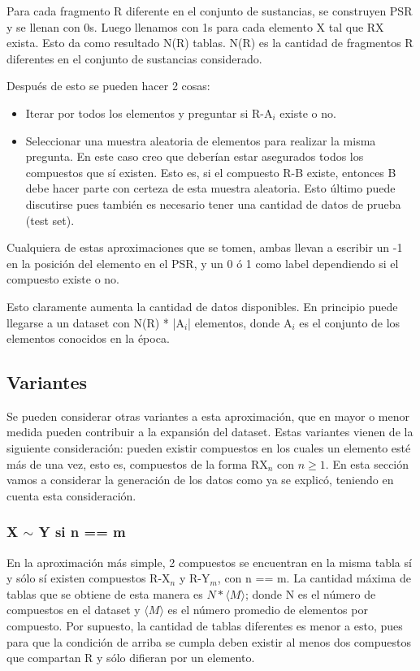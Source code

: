 \documentclass[twoside,twocolumn]{article}
\begin{document}
Para cada fragmento R diferente en el conjunto de sustancias, se construyen PSR y se llenan con 0s. 
Luego llenamos con 1s para cada elemento X tal que RX exista. Esto da como resultado N(R) tablas. N(R) es la cantidad de fragmentos R diferentes en el conjunto de sustancias considerado.

Despu\'es de esto se pueden hacer 2 cosas:

\begin{itemize}
	\item Iterar por todos los elementos y preguntar si R-A$_i$ existe o no.
	\item Seleccionar una muestra aleatoria de elementos para realizar la misma pregunta. En este caso creo que deber\'ian estar asegurados todos los compuestos que s\'i existen. Esto es, si el compuesto R-B existe, entonces B debe hacer parte con certeza de esta muestra aleatoria.
	Esto \'ultimo puede discutirse pues tambi\'en es necesario tener una cantidad de datos de prueba (test set).
\end{itemize}

Cualquiera de estas aproximaciones que se tomen, ambas llevan a escribir un -1 en la posici\'on del elemento en el PSR, y un 0 \'o 1 como label dependiendo si el compuesto existe o no.

Esto claramente aumenta la cantidad de datos disponibles. En principio puede llegarse a un dataset con N(R) * |{A$_i$}| elementos, donde {A$_i$} es el conjunto de los elementos conocidos en la \'epoca.

\subsection{Variantes} 
\label{sec:variantes}

Se pueden considerar otras variantes a esta aproximaci\'on, que en mayor o menor medida pueden contribuir a la expansi\'on del dataset. Estas variantes vienen de la siguiente consideraci\'on: pueden existir compuestos en los cuales un elemento est\'e m\'as de una vez, esto es, compuestos de la forma RX$_n$ con $n \geq 1$. En esta secci\'on vamos a considerar la generaci\'on de los datos como ya se explic\'o, teniendo en cuenta esta consideraci\'on.

\subsubsection{X $\sim$ Y si n == m}
En la aproximaci\'on m\'as simple, 2 compuestos se encuentran en la misma tabla s\'i y s\'olo s\'i existen compuestos R-X$_n$ y R-Y$_m$, con n == m. La cantidad m\'axima de tablas que se obtiene de esta manera es $N*\langle M \rangle$; donde N es el n\'umero de compuestos en el dataset y $\langle M \rangle$ es el n\'umero promedio de elementos por compuesto. Por supuesto, la cantidad de tablas diferentes es menor a esto, pues para que la condici\'on de arriba se cumpla deben existir al menos dos compuestos que compartan R y s\'olo difieran por un elemento.
\end{document}
